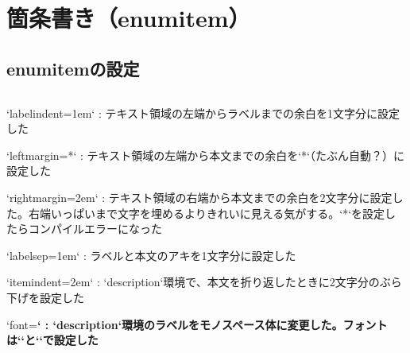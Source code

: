 \section{箇条書き（enumitem）}

\subsection{enumitemの設定}

\inputminted{latex}{./preamble/enumitem.tex}

\begin{markdown}
  `labelindent=1em`
  : テキスト領域の左端からラベルまでの余白を1文字分に設定した

  `leftmargin=*`
  : テキスト領域の左端から本文までの余白を`*`（たぶん自動？）に設定した

  `rightmargin=2em`
  :
  テキスト領域の右端から本文までの余白を2文字分に設定した。右端いっぱいまで文字を埋めるよりきれいに見える気がする。`*`を設定したらコンパイルエラーになった

  `labelsep=1em`
  : ラベルと本文のアキを1文字分に設定した

  `itemindent=2em`
  : `description`環境で、本文を折り返したときに2文字分のぶら下げを設定した

  `font=\ttfamily\bfseries`
  :
  `description`環境のラベルをモノスペース体に変更した。フォントは`\setmonofont{}`と`\setmonojfont{}`で設定した
\end{markdown}
